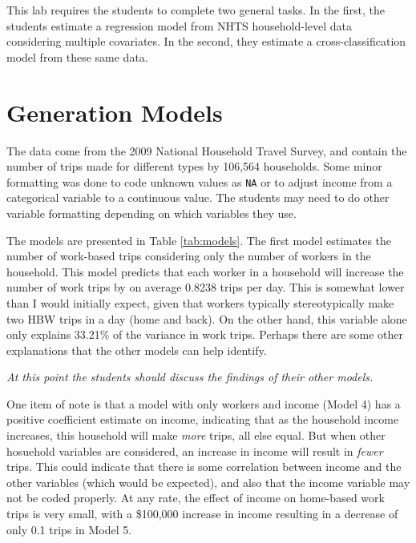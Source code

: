\documentclass[]{texMemo}\usepackage[]{graphicx}\usepackage[]{color}
\begin{document}
\maketitle






This lab requires the students to complete two general tasks. In the first, the
students estimate a regression model from NHTS household-level data considering
multiple covariates. In the second, they estimate a cross-classification model
from these same data.


\section*{Generation Models}




The data come from the 2009 National Household Travel Survey, and contain the 
number of trips made for different types by 106,564 households. 
Some minor formatting was done to code unknown values as \texttt{NA} or to adjust
income from a categorical variable to a continuous value. The students may 
need to do other variable formatting depending on which variables they use.




The models are presented in Table \ref{tab:models}. The first model estimates 
the number of work-based trips considering only the number of workers in the 
household. This model predicts that each worker in a household will increase 
the number of work trips by on average 0.8238 trips
per day. This is somewhat lower than I would initially expect, given that workers
typically stereotypically make two HBW trips in a day (home and back). On the
other hand, this variable alone only explains 
33.21\% of the variance in work trips.
Perhaps there are some other explanations that the other models can help 
identify.

{\em At this point the students should discuss the findings of their other 
models.}

One item of note is that a model with only workers and income (Model 4) has a 
positive coefficient estimate on income, indicating that as the household
income increases, this household will make {\em more} trips, all else equal. But
when other hosuehold variables are considered, an increase in income will 
result in {\em fewer} trips. This could indicate that there is some correlation 
between income and the other variables (which would be expected), and also that 
the income variable may not be coded properly. At any rate, the effect of income
on home-based work trips is very small, with a \$100,000 increase in income 
resulting in a decrease of only 0.1 trips in Model 5.
\end{document}
